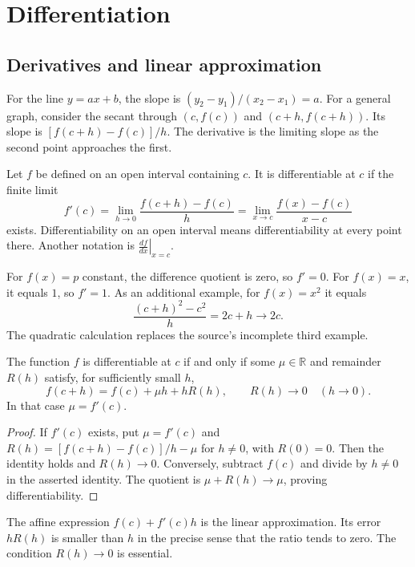 \chapter{Differentiation}\label{chap:analysis-differentiation}

\section{Derivatives and linear approximation}
For the line $y=ax+b$, the slope is $(y_2-y_1)/(x_2-x_1)=a$.
For a general graph, consider the secant through $(c,f(c))$ and
$(c+h,f(c+h))$. Its slope is $[f(c+h)-f(c)]/h$.
The derivative is the limiting slope as the second point approaches the first.

\begin{definition}[Derivative]
Let $f$ be defined on an open interval containing $c$. It is differentiable
at $c$ if the finite limit
\[
f'(c)=\lim_{h\to0}\frac{f(c+h)-f(c)}h
=\lim_{x\to c}\frac{f(x)-f(c)}{x-c}
\]
exists. Differentiability on an open interval means differentiability at
every point there. Another notation is $\left.\frac{df}{dx}\right|_{x=c}$.
\end{definition}

\begin{example}
For $f(x)=p$ constant, the difference quotient is zero, so $f'=0$.
For $f(x)=x$, it equals $1$, so $f'=1$.
As an additional example, for $f(x)=x^2$ it equals
\[
\frac{(c+h)^2-c^2}{h}=2c+h\longrightarrow2c.
\]
The quadratic calculation replaces the source's incomplete third example.
\end{example}

\begin{theorem}\label{thm:analysis-linear}
The function $f$ is differentiable at $c$ if and only if some $\mu\in\mathbb R$
and remainder $R(h)$ satisfy, for sufficiently small $h$,
\[
f(c+h)=f(c)+\mu h+hR(h),\qquad R(h)\longrightarrow0\quad(h\to0).
\]
In that case $\mu=f'(c)$.
\end{theorem}
\begin{proof}
If $f'(c)$ exists, put $\mu=f'(c)$ and
$R(h)=[f(c+h)-f(c)]/h-\mu$ for $h\ne0$, with $R(0)=0$.
Then the identity holds and $R(h)\to0$.
Conversely, subtract $f(c)$ and divide by $h\ne0$ in the asserted identity.
The quotient is $\mu+R(h)\to\mu$, proving differentiability.
\end{proof}
The affine expression $f(c)+f'(c)h$ is the linear approximation. Its error
$hR(h)$ is smaller than $h$ in the precise sense that the ratio tends to
zero. The condition $R(h)\to0$ is essential.

